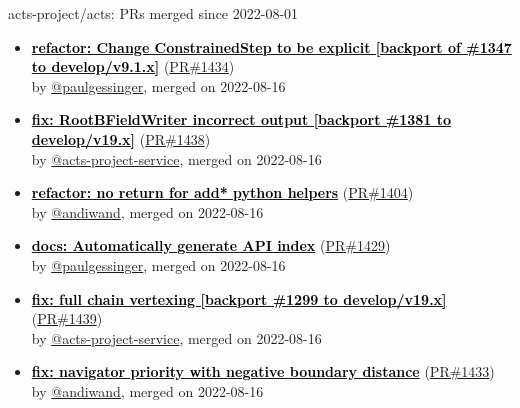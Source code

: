 \documentclass{beamer}
\begin{document}
\begin{frame}[allowframebreaks]{ acts-project/acts: PRs merged since 2022-08-01 }
\begin{itemize}
    \item
    \textbf{\href{https://github.com/acts-project/acts/pull/1434}{\textcolor{black}{refactor: Change ConstrainedStep to be explicit [backport of \#1347 to develop/v9.1.x]}}}
    (\href{https://github.com/acts-project/acts/pull/1434}{PR\#1434}) \\
    by \href{https://github.com/paulgessinger}{ @paulgessinger}, merged on 2022-08-16

    \item
    \textbf{\href{https://github.com/acts-project/acts/pull/1438}{\textcolor{black}{fix: RootBFieldWriter incorrect output [backport \#1381 to develop/v19.x]}}}
    (\href{https://github.com/acts-project/acts/pull/1438}{PR\#1438}) \\
    by \href{https://github.com/acts-project-service}{ @acts-project-service}, merged on 2022-08-16

    \item
    \textbf{\href{https://github.com/acts-project/acts/pull/1404}{\textcolor{black}{refactor: no return for add* python helpers}}}
    (\href{https://github.com/acts-project/acts/pull/1404}{PR\#1404}) \\
    by \href{https://github.com/andiwand}{ @andiwand}, merged on 2022-08-16

    \item
    \textbf{\href{https://github.com/acts-project/acts/pull/1429}{\textcolor{black}{docs: Automatically generate API index}}}
    (\href{https://github.com/acts-project/acts/pull/1429}{PR\#1429}) \\
    by \href{https://github.com/paulgessinger}{ @paulgessinger}, merged on 2022-08-16

    \item
    \textbf{\href{https://github.com/acts-project/acts/pull/1439}{\textcolor{black}{fix: full chain vertexing [backport \#1299 to develop/v19.x]}}}
    (\href{https://github.com/acts-project/acts/pull/1439}{PR\#1439}) \\
    by \href{https://github.com/acts-project-service}{ @acts-project-service}, merged on 2022-08-16

    \item
    \textbf{\href{https://github.com/acts-project/acts/pull/1433}{\textcolor{black}{fix: navigator priority with negative boundary distance}}}
    (\href{https://github.com/acts-project/acts/pull/1433}{PR\#1433}) \\
    by \href{https://github.com/andiwand}{ @andiwand}, merged on 2022-08-16


\end{itemize}
\end{frame}
\end{document}

